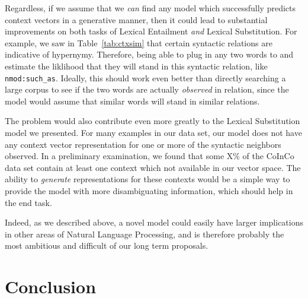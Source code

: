 \documentclass[letterpaper]{article}
\begin{document}
Regardless, if we assume that we {\em can} find any model which successfully
predicts context vectors in a generative manner, then it could lead to
substantial improvements on both tasks of Lexical Entailment {\em and} Lexical
Substitution. For example, we saw in Table~\ref{tab:ctxsim} that certain
syntactic relations are indicative of hypernymy. Therefore, being able to plug
in any two words to and estimate the liklihood that they will stand in this
syntactic relation, like {\tt nmod:such\_as}. Ideally, this should work even
better than directly searching a large corpus to see if the two words are
actually {\em observed} in relation, since the model would assume that similar
words will stand in similar relations.

The problem would also contribute even more greatly to the Lexical Substitution
model we presented. For many examples in our data set, our model does not have
any context vector representation for one or more of the syntactic neighbors
observed. In a preliminary examination, we found that some X\% of the CoInCo
data set contain at least one context which not available in our vector space.
The ability to {\em generate} representations for these contexts would be
a simple way to provide the model with more disambiguating information, which
should help in the end task.

Indeed, as we described above, a novel model could easily have larger
implications in other areas of Natural Language Processing, and is therefore
probably the most ambitious and difficult of our long term proposals.

\section{Conclusion}

\pagebreak


\end{document}
